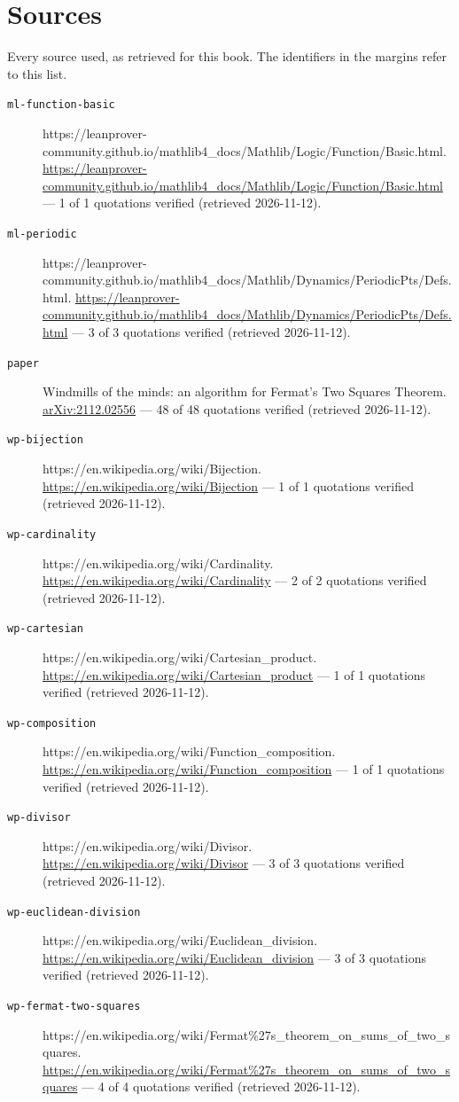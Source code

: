 \documentclass[11pt,letterpaper,openright]{book}
\begin{document}
\chapter{Sources}
Every source used, as retrieved for this book. The identifiers in the margins refer to this list.
\begin{description}\item[\texttt{ml-function-basic}] https://leanprover-community.github.io/mathlib4\_docs/Mathlib/Logic/Function/Basic.html. \url{https://leanprover-community.github.io/mathlib4_docs/Mathlib/Logic/Function/Basic.html} --- 1 of 1 quotations verified (retrieved 2026-11-12).
\item[\texttt{ml-periodic}] https://leanprover-community.github.io/mathlib4\_docs/Mathlib/Dynamics/PeriodicPts/Defs.html. \url{https://leanprover-community.github.io/mathlib4_docs/Mathlib/Dynamics/PeriodicPts/Defs.html} --- 3 of 3 quotations verified (retrieved 2026-11-12).
\item[\texttt{paper}] Windmills of the minds: an algorithm for Fermat's Two Squares Theorem. \url{arXiv:2112.02556} --- 48 of 48 quotations verified (retrieved 2026-11-12).
\item[\texttt{wp-bijection}] https://en.wikipedia.org/wiki/Bijection. \url{https://en.wikipedia.org/wiki/Bijection} --- 1 of 1 quotations verified (retrieved 2026-11-12).
\item[\texttt{wp-cardinality}] https://en.wikipedia.org/wiki/Cardinality. \url{https://en.wikipedia.org/wiki/Cardinality} --- 2 of 2 quotations verified (retrieved 2026-11-12).
\item[\texttt{wp-cartesian}] https://en.wikipedia.org/wiki/Cartesian\_product. \url{https://en.wikipedia.org/wiki/Cartesian_product} --- 1 of 1 quotations verified (retrieved 2026-11-12).
\item[\texttt{wp-composition}] https://en.wikipedia.org/wiki/Function\_composition. \url{https://en.wikipedia.org/wiki/Function_composition} --- 1 of 1 quotations verified (retrieved 2026-11-12).
\item[\texttt{wp-divisor}] https://en.wikipedia.org/wiki/Divisor. \url{https://en.wikipedia.org/wiki/Divisor} --- 3 of 3 quotations verified (retrieved 2026-11-12).
\item[\texttt{wp-euclidean-division}] https://en.wikipedia.org/wiki/Euclidean\_division. \url{https://en.wikipedia.org/wiki/Euclidean_division} --- 3 of 3 quotations verified (retrieved 2026-11-12).
\item[\texttt{wp-fermat-two-squares}] https://en.wikipedia.org/wiki/Fermat\%27s\_theorem\_on\_sums\_of\_two\_squares. \url{https://en.wikipedia.org/wiki/Fermat%27s_theorem_on_sums_of_two_squares} --- 4 of 4 quotations verified (retrieved 2026-11-12).

\end{description}
\end{document}
